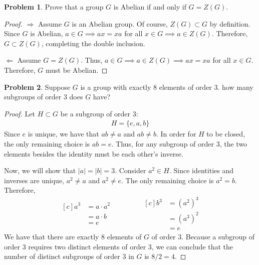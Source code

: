 \documentclass[12pt,reqno]{article}
\theoremstyle{plain}
\theoremstyle{definition}
\newtheorem{problem}{Problem}
\begin{document}
\newpage


\begin{problem} 
    Prove that a group $G$ is Abelian if and only if $G = Z(G)$.
\end{problem}

\begin{proof}
    \(\Rightarrow\) Assume \(G\) is an Abelian group. Of course, \(Z(G)\subset G\) by definition. Since 
    \(G\) is Abelian, \(a\in G\implies ax=xa\) for all \(x\in G\implies a\in Z(G)\). Therefore, \(G \subset Z(G)\), completing the double inclusion.

    \(\Leftarrow\) Assume \(G = Z(G)\). Thus, \(a\in G\implies a\in Z(G)\implies ax=xa\) for all \(x\in G\). 
    Therefore, \(G\) must be Abelian.
\end{proof}

\newpage


\begin{problem}
    Suppose $G$ is a group with exactly 8 elements of order $3$. how many subgroups of order $3$ does $G$ have?
\end{problem}

\begin{proof}
    Let \(H\subset G\) be a subgroup of order 3:
    \begin{align*}
        H = \{e, a, b\}
    \end{align*}
    Since \(e\) is unique, we have that \(ab\neq a\) and \(ab\neq b\). In order for \(H\) to be closed, 
    the only remaining choice is \(ab = e\). Thus, for any subgroup of order \(3\), the two elements besides
    the identity must be each other's inverse.

    Now, we will show that \(|a|=|b|=3\). Consider \(a^2\in H\). Since identities and inverses are unique,
    \(a^2\neq a\) and \(a^2\neq e\). The only remaining choice is \(a^2=b\). Therefore,
    \begin{equation*}
        \begin{aligned}[c]
            a^3 &= a \cdot a^2 \\
            &= a \cdot b\\
            &= e
        \end{aligned}
        \qquad\qquad
        \begin{aligned}[c]
            b^3 &= (a^2)^3\\
            &= (a^3)^2\\
            &= e
        \end{aligned}
    \end{equation*}
    We have that there are exactly \(8\) elements of \(G\) of order \(3\). Because a subgroup of order \(3\) 
    requires two distinct elements of order \(3\), we can conclude that the number of distinct subgroups of 
    order \(3\) in \(G\) is \(8 / 2 = 4\).
\end{proof}
\end{document}
